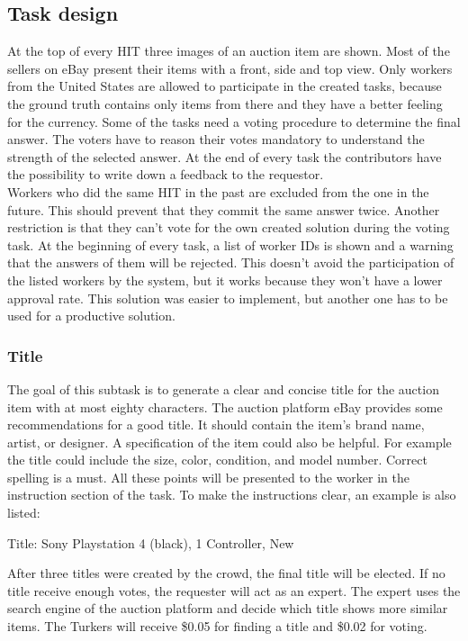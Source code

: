 \subsection{Task design}
At the top of every HIT three images of an auction item are shown. Most of the sellers on eBay present their items with a front, side and top view. Only workers from the United States are allowed to participate in the created tasks, because the ground truth contains only items from there and they have a better feeling for the currency. Some of the tasks need a voting procedure to determine the final answer. The voters have to reason their votes mandatory to understand the strength of the selected answer. At the end of every task the contributors have the possibility to write down a feedback to the requestor.\\
Workers who did the same HIT in the past are excluded from the one in the future. This should prevent that they commit the same answer twice. Another restriction is that they can't vote for the own created solution during the voting task. At the beginning of every task, a list of worker IDs is shown and a warning that the answers of them will be rejected. This doesn't avoid the participation of the listed workers by the system, but it works because they won't have a lower approval rate. This solution was easier to implement, but another one has to be used for a productive solution.
\subsubsection{Title}
The goal of this subtask is to generate a clear and concise title for the auction item with at most eighty characters. The auction platform eBay provides some recommendations for a good title. It should contain the item's brand name, artist, or designer. A specification of the item could also be helpful. For example the title could include the size, color, condition, and model number. Correct spelling is a must. All these points will be presented to the worker in the instruction section of the task. To make the instructions clear, an example is also listed: 

Title: Sony Playstation 4 (black), 1 Controller, New 

After three titles were created by the crowd, the final title will be elected. If no title receive enough votes, the requester will act as an expert. The expert uses the search engine of the auction platform and decide which title shows more similar items. The Turkers will receive \$0.05 for finding a title and \$0.02 for voting.
